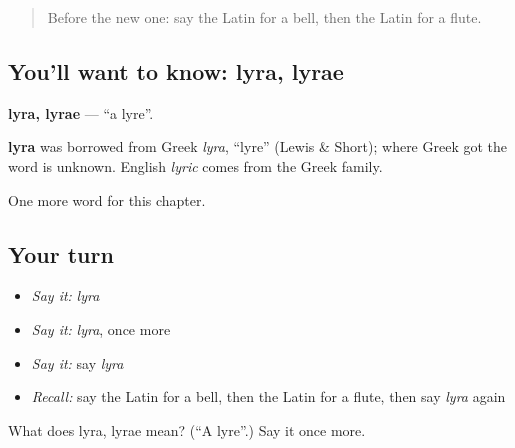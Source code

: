 \label{lesson:LA-C142-lyra}



\begin{quote}
Before the new one: say the Latin for a bell, then the Latin for a flute.
\end{quote}

\subsection*{You'll want to know: lyra, lyrae}
\textbf{lyra, lyrae} — \textquotedblleft{}a lyre\textquotedblright{}.

\begin{cousinweb}
\textbf{lyra} was borrowed from Greek \emph{lyra}, \textquotedblleft{}lyre\textquotedblright{} (Lewis \& Short); where Greek got the word is unknown. English \emph{lyric} comes from the Greek family.
\end{cousinweb}

\begin{grammarlens}[title={What you've built}]
One more word for this chapter.
\end{grammarlens}

\subsection*{Your turn}
\begin{itemize}
\raggedright
  \item \emph{Say it:} \emph{lyra}
  \item \emph{Say it:} \emph{lyra}, once more
  \item \emph{Say it:} say \emph{lyra}
  \item \emph{Recall:} say the Latin for a bell, then the Latin for a flute, then say \emph{lyra} again
\end{itemize}

\begin{tcolorbox}[breakable,colback=teal!4,colframe=teal!35!black,title={Before you move on}]
What does lyra, lyrae mean? (\textquotedblleft{}A lyre\textquotedblright{}.) Say it once more.
\end{tcolorbox}
